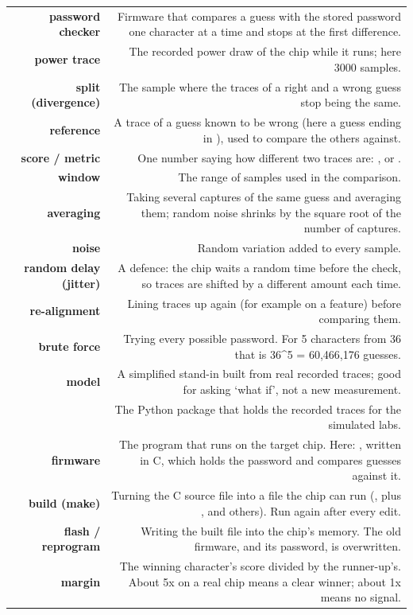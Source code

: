 \documentclass[11pt,letterpaper]{article}
\begin{document}
{\small{}
\begin{longtable}{|R{0.3188}|R{0.6812}|}
\hline
{} &  \\ \hline
\endhead
\textbf{password checker} & Firmware that compares a guess with the stored password one character at a time and stops at the first difference. \\ \hline
\textbf{power trace} & The recorded power draw of the chip while it runs; here 3000 samples. \\ \hline
\textbf{split (divergence)} & The sample where the traces of a right and a wrong guess stop being the same. \\ \hline
\textbf{reference} & A trace of a guess known to be wrong (here a guess ending in ), used to compare the others against. \\ \hline
\textbf{score / metric} & One number saying how different two traces are: ,  or . \\ \hline
\textbf{window} & The range of samples used in the comparison. \\ \hline
\textbf{averaging} & Taking several captures of the same guess and averaging them; random noise shrinks by the square root of the number of captures. \\ \hline
\textbf{noise} & Random variation added to every sample. \\ \hline
\textbf{random delay (jitter)} & A defence: the chip waits a random time before the check, so traces are shifted by a different amount each time. \\ \hline
\textbf{re-alignment} & Lining traces up again (for example on a feature) before comparing them. \\ \hline
\textbf{brute force} & Trying every possible password. For 5 characters from 36 that is 36\textasciicircum{}5 = 60,466,176 guesses. \\ \hline
\textbf{model} & A simplified stand-in built from real recorded traces; good for asking `what if', not a new measurement. \\ \hline
\textbf{} & The Python package that holds the recorded traces for the simulated labs. \\ \hline
\textbf{firmware} & The program that runs on the target chip. Here: , written in C, which holds the password and compares guesses against it. \\ \hline
\textbf{build (make)} & Turning the C source file into a file the chip can run (, plus ,  and others). Run again after every edit. \\ \hline
\textbf{flash / reprogram} & Writing the built  file into the chip's memory. The old firmware, and its password, is overwritten. \\ \hline
\textbf{margin} & The winning character's score divided by the runner-up's. About 5x on a real chip means a clear winner; about 1x means no signal. \\ \hline
\end{longtable}}
\end{document}
